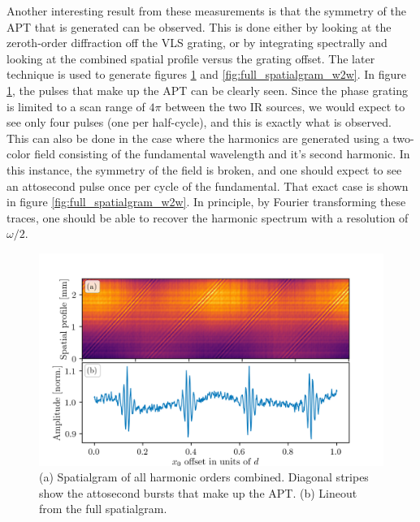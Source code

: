 Another interesting result from these measurements is that the symmetry of the APT that is generated can be observed\cite{nabekawaInterferometryAttosecondPulse2013, nabekawaInterferometricAutocorrelationAttosecond2008, mengInterferometricTimeDelay2016, kovacevExtremeUltravioletFourierTransform2005}.  This is done either by looking at the zeroth-order diffraction off the VLS grating, or by integrating spectrally and looking at the combined spatial profile versus the grating offset.  The later technique is used to generate figures \ref{fig:full_spatialgram} and \ref{fig:full_spatialgram_w2w}.  In figure \ref{fig:full_spatialgram}, the pulses that make up the APT can be clearly seen.  Since the phase grating is limited to a scan range of $4\pi$ between the two IR sources, we would expect to see only four pulses (one per half-cycle), and this is exactly what is observed.  This can also be done in the case where the harmonics are generated using a two-color field consisting of the fundamental wavelength and it's second harmonic.  In this instance, the symmetry of the field is broken, and one should expect to see an attosecond pulse once per cycle of the fundamental.  That exact case is shown in figure \ref{fig:full_spatialgram_w2w}.  In principle, by Fourier transforming these traces, one should be able to recover the harmonic spectrum with a resolution of $\omega/2$.
\begin{figure}
	\centering
	\includegraphics[width=1.0\textwidth]{figures/Two_source/full_spatialgram.png}
	\caption{(a) Spatialgram of all harmonic orders combined. Diagonal stripes show the attosecond bursts that make up the APT. (b) Lineout from the full spatialgram.  }
	\label{fig:full_spatialgram}
\end{figure}
